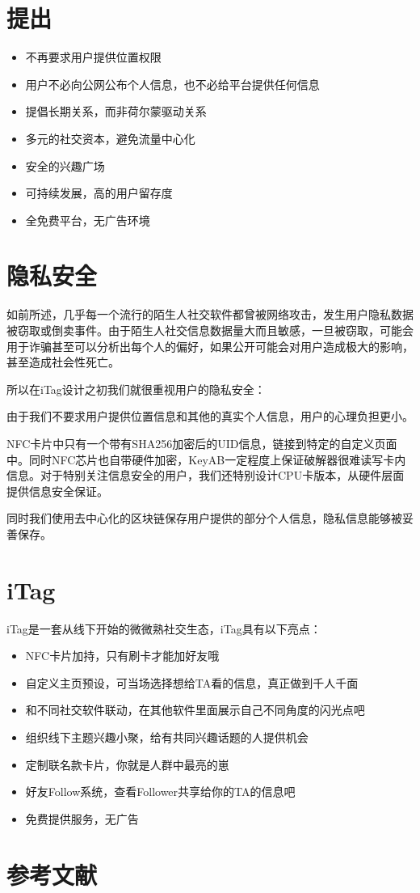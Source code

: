\documentclass[UTF8]{ctexart}
\begin{document}
\section{提出}
\begin{itemize}
    \item 不再要求用户提供位置权限
    \item 用户不必向公网公布个人信息，也不必给平台提供任何信息
    \item 提倡长期关系，而非荷尔蒙驱动关系
    \item 多元的社交资本，避免流量中心化
    \item 安全的兴趣广场
    \item 可持续发展，高的用户留存度
    \item 全免费平台，无广告环境
\end{itemize}

\section{隐私安全}

如前所述，几乎每一个流行的陌生人社交软件都曾被网络攻击，发生用户隐私数据被窃取或倒卖事件。由于陌生人社交信息数据量大而且敏感，一旦被窃取，可能会用于诈骗甚至可以分析出每个人的偏好，如果公开可能会对用户造成极大的影响，甚至造成社会性死亡。

所以在iTag设计之初我们就很重视用户的隐私安全：

由于我们不要求用户提供位置信息和其他的真实个人信息，用户的心理负担更小。

NFC卡片中只有一个带有SHA256加密后的UID信息，链接到特定的自定义页面中。同时NFC芯片也自带硬件加密，KeyAB一定程度上保证破解器很难读写卡内信息。对于特别关注信息安全的用户，我们还特别设计CPU卡版本，从硬件层面提供信息安全保证。

同时我们使用去中心化的区块链保存用户提供的部分个人信息，隐私信息能够被妥善保存。

\section{iTag}
iTag是一套从线下开始的微微熟社交生态，iTag具有以下亮点：

\begin{itemize}
    \item NFC卡片加持，只有刷卡才能加好友哦
    \item 自定义主页预设，可当场选择想给TA看的信息，真正做到千人千面
    \item 和不同社交软件联动，在其他软件里面展示自己不同角度的闪光点吧
    \item 组织线下主题兴趣小聚，给有共同兴趣话题的人提供机会
    \item 定制联名款卡片，你就是人群中最亮的崽
    \item 好友Follow系统，查看Follower共享给你的TA的信息吧~
    \item 免费提供服务，无广告
\end{itemize}

\section{参考文献}



\end{document}
